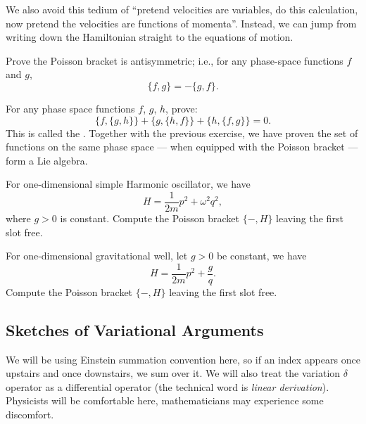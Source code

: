 We also avoid this tedium of ``pretend velocities are variables, do this
calculation, now pretend the velocities are functions of momenta''.
Instead, we can jump from writing down the Hamiltonian straight to the
equations of motion.

\begin{exercise}
Prove the Poisson bracket is antisymmetric; i.e., for any phase-space
functions $f$ and $g$,
\begin{equation*}
\{f,g\} = -\{g,f\}.
\end{equation*}
\end{exercise}

\begin{exercise}
For any phase space functions $f$, $g$, $h$, prove:
\begin{equation*}
\{f,\{g,h\}\} + \{g,\{h,f\}\} + \{h,\{f,g\}\} = 0.
\end{equation*}
This is called the . Together with the previous
exercise, we have proven the set of functions on the same phase space
--- when equipped with the Poisson bracket --- form a Lie algebra.
\end{exercise}

\begin{exercise}
  For one-dimensional simple Harmonic oscillator, we have
  \begin{equation}
H = \frac{1}{2m}p^{2} + \omega^{2}q^{2},
  \end{equation}
  where $g>0$ is constant.
Compute the Poisson bracket $\{-,H\}$ leaving the first slot free.
\end{exercise}

\begin{exercise}
  For one-dimensional gravitational well, let $g>0$ be constant, we have
  \begin{equation}
H = \frac{1}{2m}p^{2} + \frac{g}{q}.
  \end{equation}
Compute the Poisson bracket $\{-,H\}$ leaving the first slot free.
\end{exercise}

\subsection{Sketches of Variational Arguments}

 We will be using Einstein summation convention here,
so if an index appears once upstairs and once downstairs, we sum over it.
We will also treat the variation $\delta$ operator as a differential
operator (the technical word is \emph{linear derivation}). Physicists
will be comfortable here, mathematicians may experience some discomfort.




